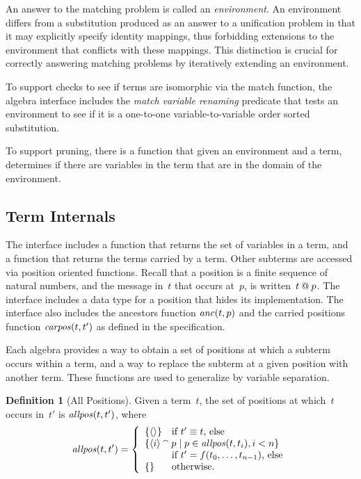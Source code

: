 \documentclass[12pt]{report}
\theoremstyle{definition}
\newtheorem{defn}{Definition}[chapter]
\begin{document}
An answer to the matching problem is called an
\emph{environment}.  An environment differs from a
substitution produced as an answer to a unification problem in that it
may explicitly specify identity mappings, thus forbidding extensions
to the environment that conflicts with these mappings.  This
distinction is crucial for correctly answering matching problems by
iteratively extending an environment.

To support checks to see if terms are isomorphic via the match
function, the algebra interface includes the \emph{match variable
  renaming} predicate that tests an environment to see if it is a
one-to-one variable-to-variable order sorted substitution.

To support pruning, there is a function that given an environment and
a term, determines if there are variables in the term that are in the
domain of the environment.

\subsection{Term Internals}\label{sec:term internals}

The interface includes a function that returns the set of variables in
a term, and a function that returns the terms carried by a term.
Other subterms are accessed via position oriented
functions.  Recall that a position is a finite sequence of natural
numbers, and the message in~$t$ that occurs at~$p$, is
written~$t\mathbin{@} p$.  The interface includes a data type for a
position that hides its implementation.  The interface also includes
the ancestors function $\operatorname{\mathit{anc}}(t,p)$ and the carried positions
function $\operatorname{\mathit{carpos}}(t,t')$ as defined in the specification.

Each algebra provides a way to obtain a set of positions at which a
subterm occurs within a term, and a way to replace the subterm at a
given position with another term.  These functions are used to
generalize by variable separation.

\begin{defn}[All Positions]
Given a term~$t$, the set of positions at which~$t$ occurs in~$t'$ is
$\operatorname{\mathit{allpos}}(t,t')$, where
$$\fn{allpos}(t,t')=\left\{
\begin{array}{ll}
\{\seq{}\}&\mbox{if $t'\equiv t$, else}\\
\multicolumn{2}{l}{\{\seq{i}\append p \mid
p\in\fn{allpos}(t,t_i),i<n\}} \\
& \mbox{if $t'=f(t_0,\ldots,t_{n-1})$, else}\\
\{\}&\mbox{otherwise.}
\end{array}\right.$$
\end{defn}
\end{document}
